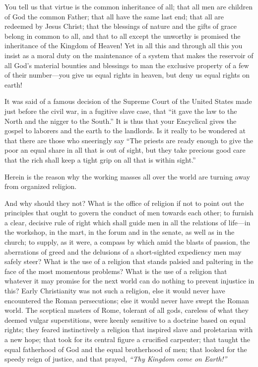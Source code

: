 \documentclass{book}
\begin{document}
You tell us that virtue is the common inheritance of all; that all men are children of God the common Father; that all have the same last end; that all are redeemed by Jesus Christ; that the blessings of nature and the gifts of grace belong in common to all, and that to all except the unworthy is promised the inheritance of the Kingdom of Heaven! Yet in all this and through all this you insist as a moral duty on the maintenance of a system that makes the reservoir of all God’s material bounties and blessings to man the exclusive property of a few of their number—you give us equal rights in heaven, but deny us equal rights on earth!

It was said of a famous decision of the Supreme Court of the United States made just before the civil war, in a fugitive slave case, that “it gave the law to the North and the nigger to the South.” It is thus that your Encyclical gives the gospel to laborers and the earth to the landlords. Is it really to be wondered at that there are those who sneeringly say “The priests are ready enough to give the poor an equal share in all that is out of sight, but they take precious good care that the rich shall keep a tight grip on all that is within sight.”

Herein is the reason why the working masses all over the world are turning away from organized religion.

And why should they not? What is the office of religion if not to point out the principles that ought to govern the conduct of men towards each other; to furnish a clear, decisive rule of right which shall guide men in all the relations of life—in the workshop, in the mart, in the forum and in the senate, as well as in the church; to supply, as it were, a compass by which amid the blasts of passion, the aberrations of greed and the delusions of a short-sighted expediency men may safely steer? What is the use of a religion that stands palsied and paltering in the face of the most momentous problems? What is the use of a religion that whatever it may promise for the next world can do nothing to prevent injustice in this? Early Christianity was not such a religion, else it would never have encountered the Roman persecutions; else it would never have swept the Roman world. The sceptical masters of Rome, tolerant of all gods, careless of what they deemed vulgar superstitions, were keenly sensitive to a doctrine based on equal rights; they feared instinctively a religion that inspired slave and proletarian with a new hope; that took for its central figure a crucified carpenter; that taught the equal fatherhood of God and the equal brotherhood of men; that looked for the speedy reign of justice, and that prayed, \emph{“Thy Kingdom come on Earth!”}
\end{document}
